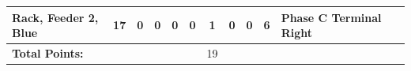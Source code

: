 \begin{table}[!htp]
{\begin{tabular}{lcccccccccll}
			Rack, Feeder 2, Blue           & 17                      & 0                                           & 0                                          & 0           & 0           & 1            & 0                & 0 & 6                            & Phase C Terminal Right           &                \\ \bottomrule
			\textbf{Total Points:}         &                         &                                             &                                            &             &             & 19           &                  &   &                              &                                  &                \\ \bottomrule
		\end{tabular}
	}
\end{table}
